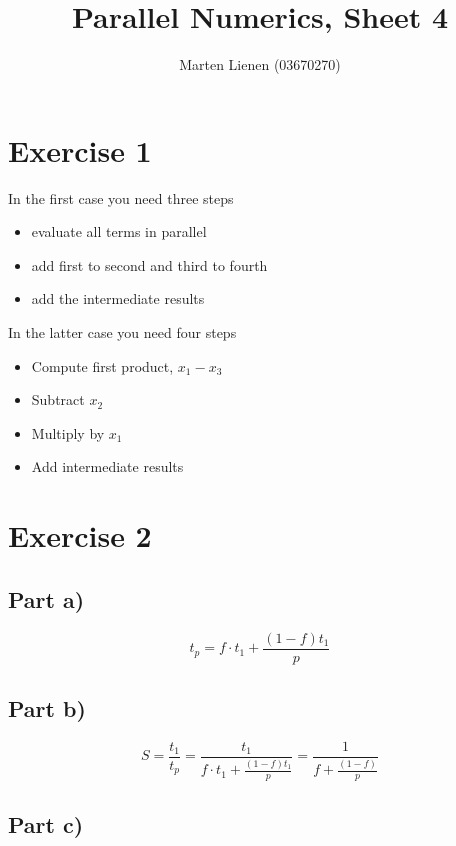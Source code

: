 \documentclass[10pt,a4paper]{article}
\title{Parallel Numerics, Sheet 4}
\author{Marten Lienen (03670270)}
\begin{document}
\maketitle

\section*{Exercise 1}

In the first case you need three steps
\begin{itemize}
\item evaluate all terms in parallel
\item add first to second and third to fourth
\item add the intermediate results
\end{itemize}

In the latter case you need four steps
\begin{itemize}
\item Compute first product, $x_{1} - x_{3}$
\item Subtract $x_{2}$
\item Multiply by $x_{1}$
\item Add intermediate results
\end{itemize}

\section*{Exercise 2}

\subsection*{Part a)}

\begin{equation*}
  t_{p} = f \cdot t_{1} + \frac{(1 - f)t_{1}}{p}
\end{equation*}

\subsection*{Part b)}

\begin{equation*}
  S = \frac{t_{1}}{t_{p}} = \frac{t_{1}}{f \cdot t_{1} + \frac{(1 - f)t_{1}}{p}} = \frac{1}{f + \frac{(1 - f)}{p}}
\end{equation*}

\subsection*{Part c)}
\end{document}
